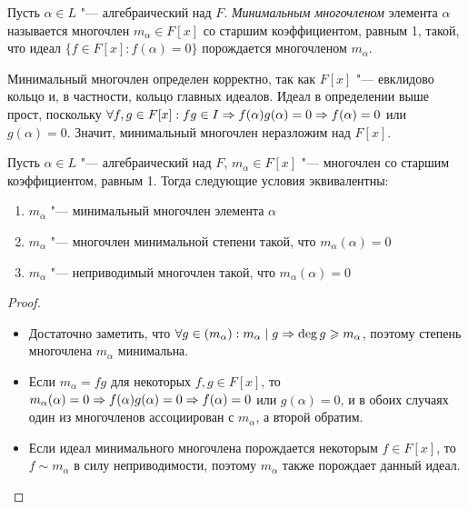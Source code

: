 \begin{definition}
	Пусть $\alpha \in L$ "--- алгебраический над $F$. \textit{Минимальным многочленом} элемента $\alpha$ называется многочлен $m_\alpha \in F[x]$ со старшим коэффициентом, равным 1, такой, что идеал $\{f \in F[x]: f(\alpha) = 0\}$ порождается многочленом $m_\alpha$.
\end{definition}

\begin{note}
	Минимальный многочлен определен корректно, так как $F[x]$ "--- евклидово кольцо и, в частности, кольцо главных идеалов. Идеал в определении выше прост, поскольку $\forall f, g \in F[x]: fg \in I \Rightarrow f(\alpha)g(\alpha) = 0 \Rightarrow f(\alpha) = 0$ или $g(\alpha) = 0$. Значит, минимальный многочлен неразложим над $F[x]$.
\end{note}

\begin{proposition}
	Пусть $\alpha \in L$ "--- алгебраический над $F$, $m_\alpha \in F[x]$ "--- многочлен со старшим коэффициентом, равным 1. Тогда следующие условия эквивалентны:
	\begin{enumerate}
		\item $m_\alpha$ "--- минимальный многочлен элемента $\alpha$
		\item $m_\alpha$ "--- многочлен минимальной степени такой, что $m_\alpha(\alpha) = 0$
		\item $m_\alpha$ "--- неприводимый многочлен такой, что $m_\alpha(\alpha) = 0$
	\end{enumerate}
\end{proposition}

\begin{proof}~
	\begin{itemize}
		\item{}Достаточно заметить, что $\forall g \in (m_\alpha): m_\alpha \mid g \Rightarrow \deg{g} \geqslant m_\alpha$, поэтому степень многочлена $m_\alpha$ минимальна.
		\item{}Если $m_\alpha = fg$ для некоторых $f, g \in F[x]$, то $m_\alpha(\alpha) = 0 \ra f(\alpha)g(\alpha) = 0 \hm\ra f(\alpha) = 0$ или $g(\alpha) = 0$, и в обоих случаях один из многочленов ассоциирован с $m_\alpha$, а второй обратим.
		\item{}Если идеал минимального многочлена порождается некоторым $f \in F[x]$, то $f \sim m_\alpha$ в силу неприводимости, поэтому $m_\alpha$ также порождает данный идеал.\qedhere
	\end{itemize}
\end{proof}

